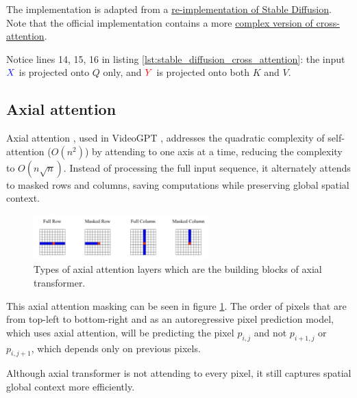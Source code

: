 The implementation is adapted from a \href{https://github.com/hkproj/pytorch-stable-diffusion/blob/e0cb06de011787cdf13eed7b4287ad8410491149/sd/attention.py#L100C1-L110C28}{re-implementation of Stable Diffusion}. Note that the official implementation contains a more \href{https://github.com/CompVis/stable-diffusion/blob/21f890f9da3cfbeaba8e2ac3c425ee9e998d5229/ldm/modules/attention.py#L152}{complex version of cross-attention}.

Notice lines 14, 15, 16 in listing \ref{lst:stable_diffusion_cross_attention}: the input $\textcolor{blue}{X}$ is projected onto $Q$ only, and $\textcolor{red}{Y}$ is projected onto both $K$ and $V$.














\subsection{Axial attention}

Axial attention \cite{axial_attention}, used in VideoGPT \cite{videogpt}, addresses the quadratic complexity of self-attention ($O(n^2)$) by attending to one axis at a time, reducing the complexity to $O(n\sqrt{n})$. Instead of processing the full input sequence, it alternately attends to masked rows and columns, saving computations while preserving global spatial context.

\begin{figure}
    \centering
    \includegraphics[width=0.6\textwidth]{images/appendix/attention/axial.png}
    \caption{Types of axial attention layers which are the building blocks of axial transformer.}
    \label{fig:axial_attention}
\end{figure}

This axial attention masking can be seen in figure \ref{fig:axial_attention}. The order of pixels that are from top-left to bottom-right and as an autoregressive pixel prediction model, which uses axial attention, will be predicting the pixel $p_{i, j}$ and not $p_{i+1, j}$ or $p_{i, j+1}$, which depends only on previous pixels.

Although axial transformer is not attending to every pixel, it still captures spatial global context more efficiently.
